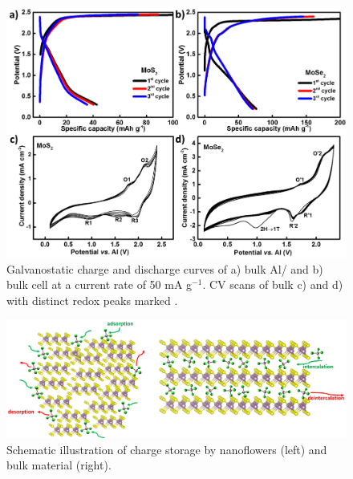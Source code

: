 \begin{figure}[th!]
\centering
\includegraphics[width=\textwidth]{Figures/chap4fig/mox2bulkcdccv}
\caption{Galvanostatic charge and discharge curves of a) bulk Al/ and b) bulk  cell at a current rate of 50 mA g$^{-1}$. CV scans of bulk c)  and d)  with distinct redox peaks marked .}
\label{Figures/chap4fig:mox2bulkcdccv}
\end{figure}

\begin{figure}[h!]
  \centering
  \includegraphics[width=\textwidth]{Figures/chap4fig/bulknano}
    \caption{Schematic illustration of charge storage by  nanoflowers (left) and bulk material (right).}
  \label{Figures/chap4fig:bulknano}
\end{figure}

